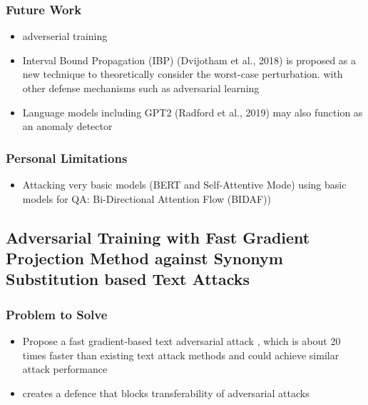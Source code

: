 \documentclass{article}
\begin{document}
\begin{flushleft}
\subsubsection*{Future Work}
\begin{itemize}
  \item adverserial training
  \item Interval Bound Propagation (IBP) (Dvijotham et al., 2018) is proposed as a new technique to theoretically consider the worst-case perturbation. with other defense mechanisms such as adversarial learning
  \item Language models including GPT2 (Radford et al., 2019) may also function as an anomaly detector
\end{itemize}

\subsubsection*{Personal Limitations}
\begin{itemize}
    \item Attacking very basic models (BERT and Self-Attentive Mode) using basic models for QA: Bi-Directional Attention Flow (BIDAF))
\end{itemize}



\subsection{ Adversarial Training with Fast Gradient Projection Method
against Synonym Substitution based Text Attacks  \cite{wang2021adversarial} }



\subsubsection*{Problem to Solve}
\begin{itemize}
    \item Propose a fast gradient-based text adversarial attack , which is about 20 times faster than existing text attack methods and could achieve similar attack performance
    \item creates a defence that blocks transferability of adversarial attacks
\end{itemize}


\end{flushleft}
\end{document}
